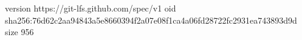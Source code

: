 version https://git-lfs.github.com/spec/v1
oid sha256:76d62c2aa94843a5e8660394f2a07e08f1ca4a06fd28722fc2931ea743893d9d
size 956
